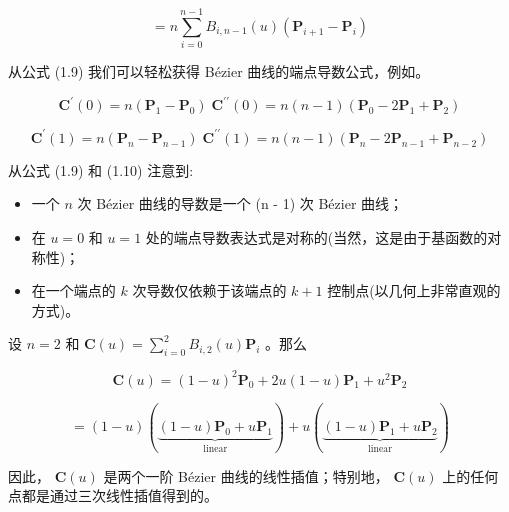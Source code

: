 \documentclass[../main.tex]{subfiles}
\begin{document}
\[
= n\mathop{\sum }\limits_{{i = 0}}^{{n - 1}}{B}_{i,n - 1}\left( u\right) \left( {{\mathbf{P}}_{i + 1} - {\mathbf{P}}_{i}}\right)  \tag{1.9}
\]

从公式 (1.9) 我们可以轻松获得 Bézier 曲线的端点导数公式，例如。

\[
{\mathbf{C}}^{\prime }\left( 0\right)  = n\left( {{\mathbf{P}}_{1} - {\mathbf{P}}_{0}}\right) \;{\mathbf{C}}^{\prime \prime }\left( 0\right)  = n\left( {n - 1}\right) \left( {{\mathbf{P}}_{0} - 2{\mathbf{P}}_{1} + {\mathbf{P}}_{2}}\right)
\]

\[
{\mathbf{C}}^{\prime }\left( 1\right)  = n\left( {{\mathbf{P}}_{n} - {\mathbf{P}}_{n - 1}}\right) \;{\mathbf{C}}^{\prime \prime }\left( 1\right)  = n\left( {n - 1}\right) \left( {{\mathbf{P}}_{n} - 2{\mathbf{P}}_{n - 1} + {\mathbf{P}}_{n - 2}}\right)  \tag{1.10}
\]

从公式 (1.9) 和 (1.10) 注意到:

\begin{itemize}
\item 一个 \(n\) 次 Bézier 曲线的导数是一个 (n - 1) 次 Bézier 曲线；
\end{itemize}

\begin{itemize}
\item 在 \(u = 0\) 和 \(u = 1\) 处的端点导数表达式是对称的(当然，这是由于基函数的对称性)；
\end{itemize}

\begin{itemize}
\item 在一个端点的 \(k\) 次导数仅依赖于该端点的 \(k + 1\) 控制点(以几何上非常直观的方式)。
\end{itemize}

设 \(n = 2\) 和 \(\mathbf{C}\left( u\right)  = \mathop{\sum }\limits_{{i = 0}}^{2}{B}_{i,2}\left( u\right) {\mathbf{P}}_{i}\) 。那么

\[
\mathbf{C}\left( u\right)  = {\left( 1 - u\right) }^{2}{\mathbf{P}}_{0} + {2u}\left( {1 - u}\right) {\mathbf{P}}_{1} + {u}^{2}{\mathbf{P}}_{2}
\]

\[
= \left( {1 - u}\right) \left( \underset{\text{ linear }}{\underbrace{\left( {1 - u}\right) {\mathbf{P}}_{0} + u{\mathbf{P}}_{1}}}\right)  + u\left( \underset{\text{ linear }}{\underbrace{\left( {1 - u}\right) {\mathbf{P}}_{1} + u{\mathbf{P}}_{2}}}\right)
\]

因此， \(\mathbf{C}\left( u\right)\) 是两个一阶 Bézier 曲线的线性插值；特别地， \(\mathbf{C}\left( u\right)\) 上的任何点都是通过三次线性插值得到的。
\end{document}
